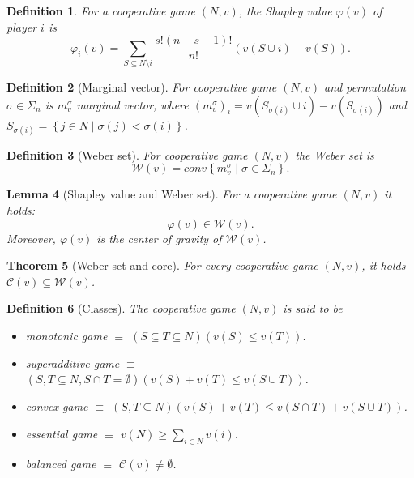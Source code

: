 \documentclass[12pt]{report}
\newcounter{theorem}
\newtheorem{definition}[theorem]{Definition}
\newtheorem{theorem}{Theorem}
\newtheorem{lemma}[theorem]{Lemma}
\def\phi{\varphi}
\begin{document}
\begin{definition}
  For a cooperative game $(N,v)$, the Shapley value $\phi(v)$ of player $i$ is
  \[
    \phi_i(v) = \sum_{S \subseteq N \setminus i}\frac{s!(n-s-1)!}{n!}\left(v(S \cup i) - v(S)\right).
  \]
\end{definition}

\begin{definition}[Marginal vector]
  For cooperative game $(N,v)$ and permutation $\sigma \in \Sigma_n$ is $m_v^\sigma$ marginal vector, where $\left(m_v^\sigma\right)_i = v\left(S_{\sigma(i)}\cup i\right)-v\left(S_{\sigma(i)}\right)$ and $S_{\sigma(i)}= \left\{j \in N \mid \sigma(j) < \sigma(i)\right\}$.
\end{definition}

\begin{definition}[Weber set]
  For cooperative game $(N,v)$ the Weber set is
  \[
    \mathcal{W}(v)=conv\left\{m^{\sigma}_{v}\mid \sigma \in \Sigma_n\right\}.
  \]
\end{definition}

\begin{lemma}[Shapley value and Weber set]
  For a cooperative game $(N,v)$ it holds:
	\[
    \phi(v) \in \mathcal{W}(v).
  \]
	Moreover, $\phi(v)$ is the center of gravity of $\mathcal{W}(v)$.
\end{lemma}

\begin{theorem}[Weber set and core]
  For every cooperative game $(N,v)$, it holds $\mathcal{C}(v) \subseteq \mathcal{W}(v)$.
\end{theorem}

\begin{definition}[Classes]
  The cooperative game $(N,v)$ is said to be
  \begin{itemize}
    \item monotonic game $\equiv$ $\left(S \subseteq T \subseteq N\right)\left(v(S) \leq v(T)\right)$.
		\item superadditive game $\equiv$ $\left(S,T \subseteq N, S \cap T = \emptyset\right)\left(v(S)+v(T) \leq v\left(S \cup T\right)\right)$.
		\item convex game $\equiv$ $\left(S,T \subseteq N\right)\left(v(S)+v(T) \leq v\left(S \cap T\right)+v\left(S \cup T\right)\right)$.
		\item essential game $\equiv$ $v(N) \geq \sum_{i \in N} v(i)$.
		\item balanced game $\equiv$ $\mathcal{C}(v) \neq \emptyset$.
  \end{itemize}
\end{definition}
\end{document}
